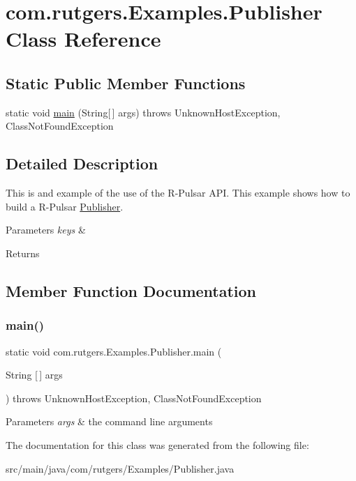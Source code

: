 \hypertarget{classcom_1_1rutgers_1_1Examples_1_1Publisher}{}\section{com.\+rutgers.\+Examples.\+Publisher Class Reference}
\label{classcom_1_1rutgers_1_1Examples_1_1Publisher}
\subsection*{Static Public Member Functions}
\begin{DoxyCompactItemize}
\item 
static void \hyperlink{classcom_1_1rutgers_1_1Examples_1_1Publisher_a974dd2b5aa8cb52fc14fe0b6d14c52d4}{main} (String\mbox{[}$\,$\mbox{]} args)  throws Unknown\+Host\+Exception, Class\+Not\+Found\+Exception 
\end{DoxyCompactItemize}


\subsection{Detailed Description}
This is and example of the use of the R-\/\+Pulsar A\+PI. This example shows how to build a R-\/\+Pulsar \hyperlink{classcom_1_1rutgers_1_1Examples_1_1Publisher}{Publisher}. 
\begin{DoxyParams}{Parameters}
{\em keys} & \\
\hline
\end{DoxyParams}
\begin{DoxyReturn}{Returns}

\end{DoxyReturn}


\subsection{Member Function Documentation}
\mbox{\label{classcom_1_1rutgers_1_1Examples_1_1Publisher_a974dd2b5aa8cb52fc14fe0b6d14c52d4}} 
\subsubsection{\texorpdfstring{main()}{main()}}
{\footnotesize\ttfamily static void com.\+rutgers.\+Examples.\+Publisher.\+main (\begin{DoxyParamCaption}\item[{String \mbox{[}$\,$\mbox{]}}]{args }\end{DoxyParamCaption}) throws Unknown\+Host\+Exception, Class\+Not\+Found\+Exception\hspace{0.3cm}{\ttfamily [static]}}


\begin{DoxyParams}{Parameters}
{\em args} & the command line arguments \\
\hline
\end{DoxyParams}


The documentation for this class was generated from the following file\+:\begin{DoxyCompactItemize}
\item 
src/main/java/com/rutgers/\+Examples/Publisher.\+java\end{DoxyCompactItemize}
